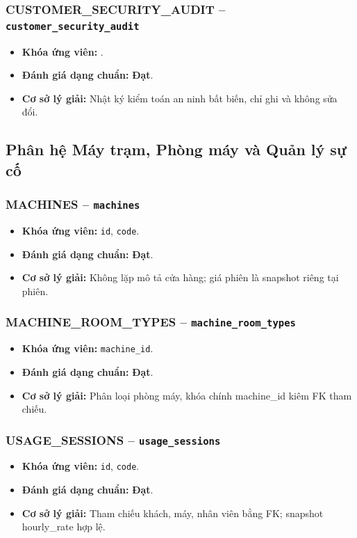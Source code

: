 \subsubsection{CUSTOMER_SECURITY_AUDIT -- \texttt{customer\_security\_audit}}
\begin{itemize}
  \item \textbf{Khóa ứng viên:} \texttt{}.
  \item \textbf{Đánh giá dạng chuẩn:} \textbf{Đạt}.
  \item \textbf{Cơ sở lý giải:} Nhật ký kiểm toán an ninh bất biến, chỉ ghi và không sửa đổi.
\end{itemize}

\subsection{Phân hệ Máy trạm, Phòng máy và Quản lý sự cố}
\subsubsection{MACHINES -- \texttt{machines}}
\begin{itemize}
  \item \textbf{Khóa ứng viên:} \texttt{id}, \texttt{code}.
  \item \textbf{Đánh giá dạng chuẩn:} \textbf{Đạt}.
  \item \textbf{Cơ sở lý giải:} Không lặp mô tả cửa hàng; giá phiên là snapshot riêng tại phiên.
\end{itemize}

\subsubsection{MACHINE_ROOM_TYPES -- \texttt{machine\_room\_types}}
\begin{itemize}
  \item \textbf{Khóa ứng viên:} \texttt{machine\_id}.
  \item \textbf{Đánh giá dạng chuẩn:} \textbf{Đạt}.
  \item \textbf{Cơ sở lý giải:} Phân loại phòng máy, khóa chính machine_id kiêm FK tham chiếu.
\end{itemize}

\subsubsection{USAGE_SESSIONS -- \texttt{usage\_sessions}}
\begin{itemize}
  \item \textbf{Khóa ứng viên:} \texttt{id}, \texttt{code}.
  \item \textbf{Đánh giá dạng chuẩn:} \textbf{Đạt}.
  \item \textbf{Cơ sở lý giải:} Tham chiếu khách, máy, nhân viên bằng FK; snapshot hourly_rate hợp lệ.
\end{itemize}

